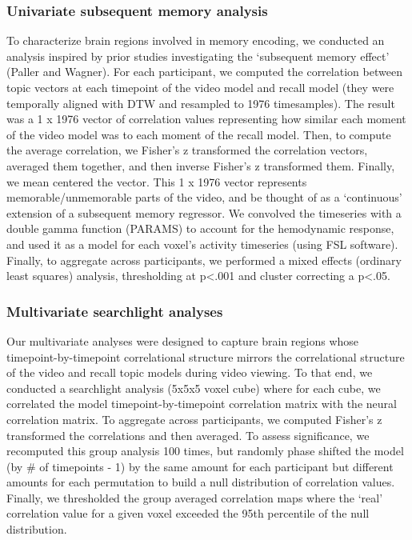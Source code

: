 \subsubsection{Univariate subsequent memory analysis}
To characterize brain regions involved in memory encoding, we conducted an analysis inspired by prior studies investigating the  `subsequent memory effect' (Paller and Wagner).  For each participant, we computed the correlation between topic vectors at each timepoint of the video model and recall model (they were temporally aligned with DTW and resampled to 1976 timesamples). The result was a 1 x 1976 vector of correlation values representing how similar each moment of the video model was to each moment of the recall model. Then, to compute the average correlation, we Fisher's z transformed the correlation vectors, averaged them together, and then inverse Fisher's z transformed them.  Finally, we mean centered the vector.  This 1 x 1976 vector represents memorable/unmemorable parts of the video, and be thought of as a `continuous' extension of a subsequent memory regressor.  We convolved the timeseries with a double gamma function (PARAMS) to account for the hemodynamic response, and used it as a model for each voxel's activity timeseries (using FSL software).  Finally, to aggregate across participants, we performed a mixed effects (ordinary least squares) analysis, thresholding at p<.001 and cluster correcting a p<.05.

\subsubsection{Multivariate searchlight analyses}
Our multivariate analyses were designed to capture brain regions whose timepoint-by-timepoint correlational structure mirrors the correlational structure of the video and recall topic models during video viewing. To that end, we conducted a searchlight analysis (5x5x5 voxel cube) where for each cube, we correlated the model timepoint-by-timepoint correlation matrix with the neural correlation matrix. To aggregate across participants, we computed Fisher's z transformed the correlations and then averaged.  To assess significance, we recomputed this group analysis 100 times, but randomly phase shifted the model (by \# of timepoints - 1) by the same amount for each participant but different amounts for each permutation to build a null distribution of correlation values. Finally, we thresholded the group averaged correlation maps where the `real' correlation value for a given voxel exceeded the 95th percentile of the null distribution.

